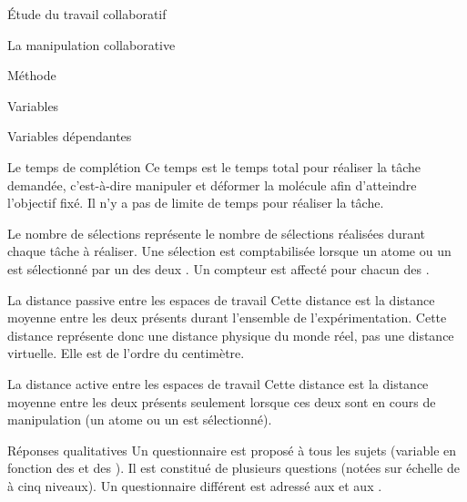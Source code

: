 \documentclass[myfrancais]{mythesis}
\begin{document}
\begin{mypart}{Étude du travail collaboratif}
\begin{mychapter}{La manipulation collaborative}
\begin{mysection}{Méthode}
\begin{mysubsection}{Variables}
\begin{mysubsubsection}{Variables dépendantes}
\begin{myparagraph}{ Le temps de complétion}
							Ce temps est le temps total pour réaliser la tâche demandée, c'est-à-dire manipuler et déformer la molécule afin d'atteindre l'objectif fixé.
							Il n'y a pas de limite de temps pour réaliser la tâche.
						\end{myparagraph}
						\begin{myparagraph}{ Le nombre de sélections}
							 représente le nombre de sélections réalisées durant chaque tâche à réaliser.
							Une sélection est comptabilisée lorsque un atome ou un  est sélectionné par un des deux .
							Un compteur est affecté pour chacun des .
						\end{myparagraph}
						\begin{myparagraph}{ La distance passive entre les espaces de travail}
							Cette distance est la distance moyenne entre les deux  présents durant l'ensemble de l'expérimentation.
							Cette distance représente donc une distance physique du monde réel, pas une distance virtuelle.
							Elle est de l'ordre du centimètre.
						\end{myparagraph}
						\begin{myparagraph}{ La distance active entre les espaces de travail}
							Cette distance est la distance moyenne entre les deux  présents seulement lorsque ces deux  sont en cours de manipulation (un atome ou un  est sélectionné).
						\end{myparagraph}
						\begin{myparagraph}{ Réponses qualitatives}
							Un questionnaire est proposé à tous les sujets (variable en fonction des  et des ).
							Il est constitué de plusieurs questions (notées sur échelle de  à cinq niveaux).
							Un questionnaire différent est adressé aux  et aux .


\end{myparagraph}
\end{mysubsubsection}
\end{mysubsection}
\end{mysection}
\end{mychapter}
\end{mypart}
\end{document}
